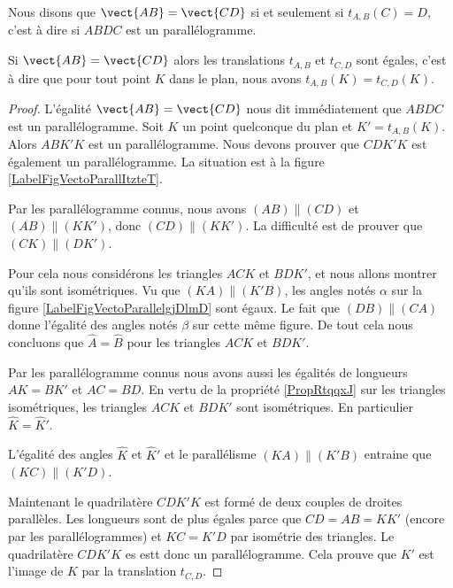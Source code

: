 \begin{definition}
    Nous disons que \( \vect{ AB }=\vect{ CD }\) si et seulement si \( t_{A,B}(C)=D\), c'est à dire si \( ABDC\) est un parallélogramme.
\end{definition}

\begin{propriete}
    Si \( \vect{ AB }=\vect{ CD }\) alors les translations \( t_{A,B}\) et \( t_{C,D}\) sont égales, c'est à dire que pour tout point \( K\) dans le plan, nous avons \( t_{A,B}(K)=t_{C,D}(K)\).
\end{propriete}

\begin{proof}
    L'égalité \( \vect{ AB }=\vect{ CD }\) nous dit immédiatement que \( ABDC\) est un parallélogramme. Soit \( K\) un point quelconque du plan et \( K'=t_{A,B}(K)\). Alors \( ABK'K\) est un parallélogramme. Nous devons prouver que \( CDK'K\) est également un parallélogramme. La situation est à la figure \ref{LabelFigVectoParallItzteT}. %
\newcommand{\CaptionFigVectoParallItzteT}{Nous savons que \( ABDC\) et \( CDK'K\) sont des parallélogramme, et nous voulons déduire que \( CDK'K\) en est également un.}


    Par les parallélogramme connus, nous avons \( (AB)\parallel (CD)\) et \( (AB)\parallel (KK')\), donc \( (CD)\parallel (KK')\). La difficulté est de prouver que \( (CK)\parallel (DK')\). 
    
    Pour cela nous considérons les triangles \( ACK\) et \( BDK'\), et nous allons montrer qu'ils sont isométriques. Vu que \( (KA)\parallel (K'B)\), les angles notés \( \alpha\) sur la figure \ref{LabelFigVectoParallelgjDlmD} sont égaux. Le fait que \( (DB)\parallel (CA)\) donne l'égalité des angles notés \( \beta\) sur cette même figure. De tout cela nous concluons que \( \hat A=\hat B\) pour les triangles \( ACK\) et \( BDK'\).
\newcommand{\CaptionFigVectoParallelgjDlmD}{Égalité de quelque angles.}


    Par les parallélogramme connus nous avons aussi les égalités de longueurs \( AK=BK'\) et \( AC=BD\). En vertu de la propriété \ref{PropRtqqxJ} sur les triangles isométriques, les triangles \( ACK\) et \( BDK'\) sont isométriques. En particulier \( \hat K=\hat K'\).

    L'égalité des angles \( \hat K\) et \( \hat K'\) et le parallélisme \( (KA)\parallel (K'B)\) entraine que \( (KC)\parallel(K'D)\).

    Maintenant le quadrilatère \( CDK'K\) est formé de deux couples de droites parallèles. Les longueurs sont de plus égales parce que \( CD=AB=KK'\) (encore par les parallélogrammes) et \( KC=K'D\) par isométrie des triangles. Le quadrilatère \( CDK'K\) es estt donc un parallélogramme. Cela prouve que \( K'\) est l'image de \( K\) par la translation \( t_{C,D}\).
\end{proof}

